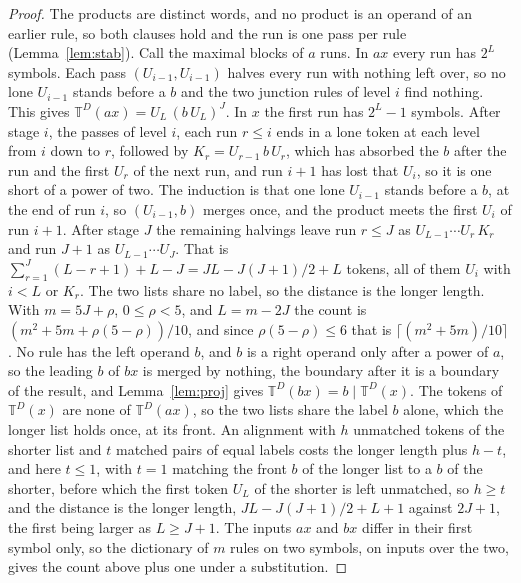 \documentclass[11pt,a4paper]{article}
\theoremstyle{definition}
\theoremstyle{plain}
\newcommand{\T}{\mathbb{T}}
\begin{document}
\begin{proof}
The products are distinct words, and no product is an operand of an earlier rule, so both clauses hold and the run is
one pass per rule (Lemma~\ref{lem:stab}). Call the maximal blocks of \(a\) runs. In \(ax\) every run has \(2^L\)
symbols. Each pass \((U_{i-1}, U_{i-1})\) halves every run with nothing left over, so no lone \(U_{i-1}\) stands before
a \(b\) and the two junction rules of level \(i\) find nothing. This gives \(\T^D(ax) = U_L\,(b\,U_L)^J\). In \(x\) the
first run has \(2^L - 1\) symbols. After stage \(i\), the passes of level \(i\), each run \(r \le i\) ends in a lone
token at each level from \(i\) down to \(r\), followed by \(K_r = U_{r-1}\,b\,U_r\), which has absorbed the \(b\) after
the run and the first \(U_r\) of the next run, and run \(i + 1\) has lost that \(U_i\), so it is one short of a power of
two. The induction is that one lone \(U_{i-1}\) stands before a \(b\), at the end of run \(i\), so \((U_{i-1}, b)\)
merges once, and the product meets the first \(U_i\) of run \(i + 1\). After stage \(J\) the remaining halvings leave
run \(r \le J\) as \(U_{L-1} \cdots U_r\,K_r\) and run \(J + 1\) as \(U_{L-1} \cdots U_J\). That is
\(\sum_{r=1}^{J}(L - r + 1) + L - J = JL - J(J+1)/2 + L\) tokens, all of them \(U_i\) with \(i < L\) or \(K_r\). The two
lists share no label, so the distance is the longer length. With \(m = 5J + \rho\), \(0 \le \rho < 5\), and
\(L = m - 2J\) the count is \((m^2 + 5m + \rho(5 - \rho))/10\), and since \(\rho(5 - \rho) \le 6\) that is
\(\lceil (m^2 + 5m)/10 \rceil\). No rule has the left operand \(b\), and \(b\) is a right operand only after a power of
\(a\), so the leading \(b\) of \(bx\) is merged by nothing, the boundary after it is a boundary of the result, and
Lemma~\ref{lem:proj} gives \(\T^D(bx) = b \mid \T^D(x)\). The tokens of \(\T^D(x)\) are none of \(\T^D(ax)\), so the two
lists share the label \(b\) alone, which the longer list holds once, at its front. An alignment with \(h\) unmatched
tokens of the shorter list and \(t\) matched pairs of equal labels costs the longer length plus \(h - t\), and here
\(t \le 1\), with \(t = 1\) matching the front \(b\) of the longer list to a \(b\) of the shorter, before which the
first token \(U_L\) of the shorter is left unmatched, so \(h \ge t\) and the distance is the longer length,
\(JL - J(J + 1)/2 + L + 1\) against \(2J + 1\), the first being larger as \(L \ge J + 1\). The inputs \(ax\) and \(bx\)
differ in their first symbol only, so the dictionary of \(m\) rules on two symbols, on inputs over the two, gives the
count above plus one under a substitution.
\end{proof}
\end{document}
